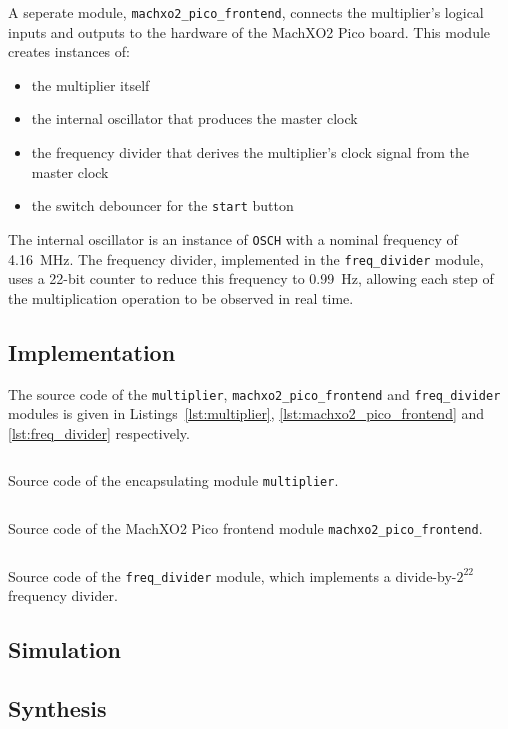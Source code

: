 \documentclass[a4paper]{article}
\newcommand{\modulelisting}[3]{
  \begin{listing}[p]
    \linespread{.9}\inputminted[fontsize=\scriptsize,linenos]{systemverilog}{#2}
    \centering\caption{#3}
    \label{lst:#1}
  \end{listing}
}
\begin{document}
A seperate module, \texttt{machxo2\_pico\_frontend}, connects the multiplier's logical inputs and outputs to the hardware of the MachXO2 Pico board. This module creates instances of:
\begin{itemize}
  \item the multiplier itself
  \item the internal oscillator that produces the master clock
  \item the frequency divider that derives the multiplier's clock signal from the master clock
  \item the switch debouncer for the \texttt{start} button
\end{itemize}
The internal oscillator is an instance of \texttt{OSCH} with a nominal frequency of \SI{4.16}{\mega\hertz}. The frequency divider, implemented in the \texttt{freq\_divider} module, uses a 22-bit counter to reduce this frequency to \SI{0.99}{\hertz}, allowing each step of the multiplication operation to be observed in real time.

\subsection{Implementation}
\label{sec:mult:impl}

The source code of the \texttt{multiplier}, \texttt{machxo2\_pico\_frontend} and \texttt{freq\_divider} modules is given in Listings~\ref{lst:multiplier}, \ref{lst:machxo2_pico_frontend} and \ref{lst:freq_divider} respectively.

\modulelisting{multiplier}{../src/multiplier/multiplier.sv}
  {Source code of the encapsulating module \texttt{multiplier}.}

\modulelisting{machxo2_pico_frontend}{../src/frontends/machxo2_pico_frontend.sv}
  {Source code of the MachXO2 Pico frontend module \texttt{machxo2\_pico\_frontend}.}

\modulelisting{freq_divider}{../src/util/freq_divider.sv}
  {Source code of the \texttt{freq\_divider} module, which implements a divide-by-$2^{22}$ frequency divider.}

\subsection{Simulation}
\label{sec:mult:sim}


\subsection{Synthesis}
\label{sec:mult:synth}

\end{document}
